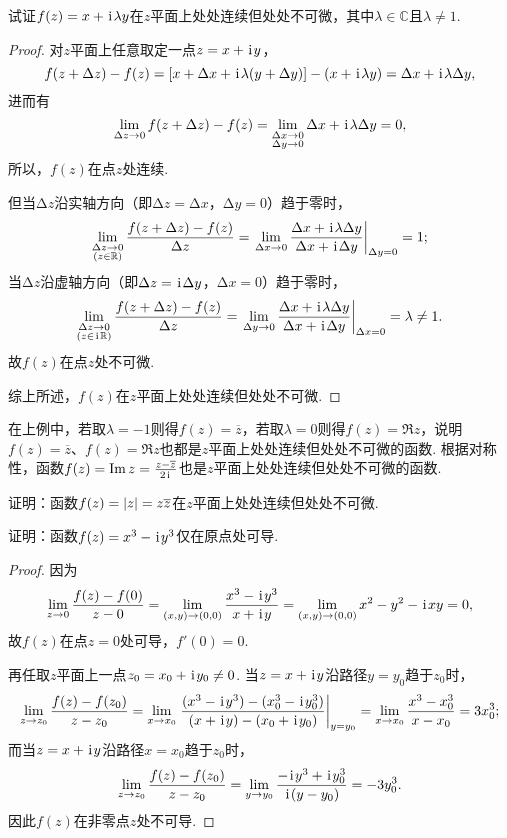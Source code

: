 \begin{example}
试证\(f(z)=x+\kern1pt\mathrm{i}\kern1pt \lambda y\)在\(z\)平面上处处连续但处处不可微，其中\(\lambda \in \mathbb{C}\)且\(\lambda \neq 1\).
\begin{proof}
对\(z\)平面上任意取定一点\(z=x+\kern1pt\mathrm{i}\kern1pt y\)，\[
f(z+\Delta z)-f(z) = [x + \Delta x + \kern1pt\mathrm{i}\kern1pt \lambda (y + \Delta y)] - (x + \kern1pt\mathrm{i}\kern1pt \lambda y) = \Delta x + \kern1pt\mathrm{i}\kern1pt \lambda \Delta y,
\]进而有\[
\lim_{\Delta z\to0} f(z+\Delta z)-f(z)
= \lim_{\substack{\Delta x\to0 \\ \Delta y\to0}} \Delta x + \kern1pt\mathrm{i}\kern1pt \lambda \Delta y
= 0,
\]所以，\(f(z)\)在点\(z\)处连续.

但当\(\increment z\)沿实轴方向（即\(\increment z = \increment x\)，\(\increment y = 0\)）趋于零时，\[
\lim_{\substack{\increment z\to0 \\ (z \in \mathbb{R})}} \frac{f(z+\increment z)-f(z)}{\increment z}
= \eval{\lim_{\increment x\to0} \frac{\increment x + \iu \lambda \increment y}{\increment x + \iu \increment y}}_{\increment y = 0} = 1;
\]当\(\increment z\)沿虚轴方向（即\(\Delta z = \kern1pt\mathrm{i}\kern1pt \Delta y\)，\(\increment x = 0\)）趋于零时，\[
\lim_{\substack{\increment z\to0 \\ (z \in \iu \mathbb{R})}} \frac{f(z+\increment z)-f(z)}{\increment z}
= \eval{\lim_{\increment y\to0} \frac{\increment x + \iu \lambda \increment y}{\increment x + \iu \increment y}}_{\increment x = 0} = \lambda \neq 1.
\]故\(f(z)\)在点\(z\)处不可微.

综上所述，\(f(z)\)在\(z\)平面上处处连续但处处不可微.
\end{proof}
\end{example}
在上例中，若取\(\lambda=-1\)则得\(f(z) = \overline{z}\)，若取\(\lambda=0\)则得\(f(z) = \Re z\)，说明\(f(z) = \overline{z}\)、\(f(z) = \Re z\)也都是\(z\)平面上处处连续但处处不可微的函数.
根据对称性，函数\(f(z) = \Im z = \frac{z - \overline{z}}{2\kern1pt\mathrm{i}\kern1pt}\)也是\(z\)平面上处处连续但处处不可微的函数.

\begin{example}
证明：函数\(f(z) = \abs{z} = z \overline{z}\)在\(z\)平面上处处连续但处处不可微.
\end{example}

\begin{example}
证明：函数\(f(z) = x^3 - \kern1pt\mathrm{i}\kern1pt y^3\)仅在原点处可导.
\begin{proof}
因为\[
\lim_{z\to0} \frac{f(z) - f(0)}{z - 0}
= \lim_{(x,y)\to(0,0)} \frac{x^3 - \kern1pt\mathrm{i}\kern1pt y^3}{x + \kern1pt\mathrm{i}\kern1pt y}
= \lim_{(x,y)\to(0,0)} x^2 - y^2 - \kern1pt\mathrm{i}\kern1pt xy
= 0,
\]故\(f(z)\)在点\(z = 0\)处可导，\(f'(0) = 0\).

再任取\(z\)平面上一点\(z_0 = x_0 + \kern1pt\mathrm{i}\kern1pt y_0 \neq 0\).
当\(z = x + \kern1pt\mathrm{i}\kern1pt y\)沿路径\(y = y_0\)趋于\(z_0\)时，\[
\lim_{z \to z_0} \frac{f(z) - f(z_0)}{z - z_0}
= \lim_{x \to x_0} \eval{\frac{(x^3 - \iu y^3) - (x_0^3 - \iu y_0^3)}{(x + \iu y) - (x_0 + \iu y_0)}}_{y = y_0}
= \lim_{x \to x_0} \frac{x^3 - x_0^3}{x - x_0}
= 3 x_0^3;
\]而当\(z = x + \kern1pt\mathrm{i}\kern1pt y\)沿路径\(x = x_0\)趋于\(z_0\)时，\[
\lim_{z \to z_0} \frac{f(z) - f(z_0)}{z - z_0}
= \lim_{y \to y_0} \frac{-\kern1pt\mathrm{i}\kern1pt y^3 + \kern1pt\mathrm{i}\kern1pt y_0^3}{\kern1pt\mathrm{i}\kern1pt (y - y_0)}
= -3 y_0^3.
\]因此\(f(z)\)在非零点\(z\)处不可导.
\end{proof}
\end{example}

